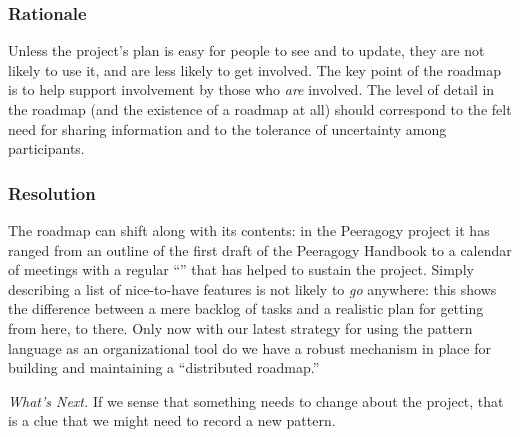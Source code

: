 \subsubsection*{Rationale} Unless the project's plan is easy for people to see and to update, they are not likely to use it, and are less likely to get involved.  The key point of the roadmap is to help support involvement by those who \emph{are} involved.   The level of detail in the roadmap (and the existence of a roadmap at all) should correspond to the felt need for sharing information and to the tolerance of uncertainty among participants.

\subsubsection*{Resolution}
The roadmap can shift along with its contents: in the Peeragogy project it has ranged from an outline of the first draft of the Peeragogy Handbook to a calendar of meetings with a regular ``'' that has helped to sustain the project. Simply describing a list of nice-to-have features is not likely to \emph{go} anywhere: this shows the difference between a mere backlog of tasks and a realistic plan for getting from here, to there.  Only now with our latest strategy for using the pattern language as an organizational tool do we have a robust mechanism in place for building and maintaining a ``distributed roadmap.''

\begin{framed}
\emph{What's Next.}
If we sense that something needs to change about the project, that is a clue that we might need to record a new pattern.
\end{framed}

\endgroup
    
    
    
    